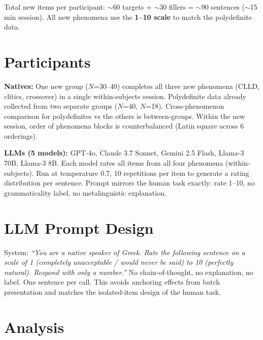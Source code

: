 \documentclass[11pt,a4paper]{article}
\begin{document}
Total new items per participant: $\sim$60 targets + $\sim$30 fillers = $\sim$90 sentences ($\sim$15\,min session). All new phenomena use the \textbf{1--10 scale} to match the polydefinite data.

\section{Participants}

\textbf{Natives:} One new group ($N$=30--40) completes all three new phenomena (CLLD, clitics, crossover) in a single within-subjects session. Polydefinite data already collected from two separate groups ($N$=40, $N$=18). Cross-phenomenon comparison for polydefinites vs the others is between-groups. Within the new session, order of phenomena blocks is counterbalanced (Latin square across 6 orderings).

\textbf{LLMs (5 models):} GPT-4o, Claude 3.7 Sonnet, Gemini 2.5 Flash, Llama-3 70B, Llama-3 8B. Each model rates all items from all four phenomena (within-subjects). Run at temperature 0.7, 10 repetitions per item to generate a rating distribution per sentence. Prompt mirrors the human task exactly: rate 1--10, no grammaticality label, no metalinguistic explanation.

\section{LLM Prompt Design}

System: \textit{``You are a native speaker of Greek. Rate the following sentence on a scale of 1 (completely unacceptable / would never be said) to 10 (perfectly natural). Respond with only a number.''} No chain-of-thought, no explanation, no label. One sentence per call. This avoids anchoring effects from batch presentation and matches the isolated-item design of the human task.

\section{Analysis}
\end{document}
